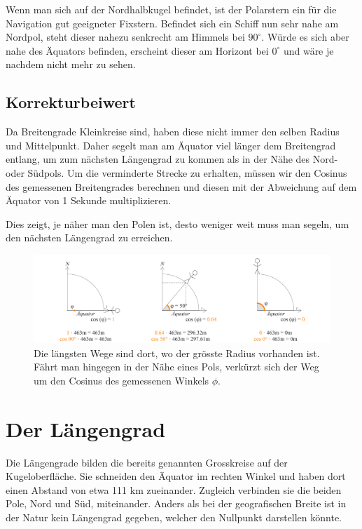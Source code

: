 \begin{refsection}
Wenn man sich auf der Nordhalbkugel befindet, ist der Polarstern
ein für die Navigation gut geeigneter Fixstern. Befindet sich ein
Schiff nun sehr nahe am Nordpol, steht dieser nahezu senkrecht am
Himmels bei $90^{\circ}$. Würde es sich aber nahe des Äquators
befinden, erscheint dieser am Horizont bei $0^{\circ}$ und wäre je
nachdem nicht mehr zu sehen.


\subsection{Korrekturbeiwert}
Da Breitengrade Kleinkreise sind, haben diese nicht immer den selben
Radius und Mittelpunkt. Daher segelt man am Äquator viel länger dem
Breitengrad entlang, um zum nächsten Längengrad zu kommen als in
der Nähe des Nord- oder Südpols.
Um die verminderte Strecke zu erhalten, müssen wir den Cosinus des
gemessenen Breitengrades berechnen und diesen mit der Abweichung
auf dem Äquator von 1 Sekunde multiplizieren.

Dies zeigt, je näher man den Polen ist, desto weniger weit muss man
segeln, um den nächsten Längengrad zu erreichen.

\begin{figure}[htbp]
\centering
\includegraphics[width=1\textwidth]{kugel/Korrekturbeiwert.jpg}
\caption{Die längsten Wege sind dort, wo der grösste Radius vorhanden
ist. Fährt man hingegen in der Nähe eines Pols, verkürzt sich der
Weg um den Cosinus des gemessenen Winkels $\phi$.}
\end{figure}

\section{Der Längengrad}
Die Längengrade bilden die bereits genannten Grosskreise auf der
Kugeloberfläche.
Sie schneiden den Äquator im rechten Winkel und haben dort einen
Abstand von etwa 111 km zueinander. Zugleich verbinden sie die
beiden Pole, Nord und Süd, miteinander. Anders als bei der geografischen
Breite ist in der Natur kein Längengrad gegeben, welcher den Nullpunkt
darstellen könnte.


\end{refsection}

